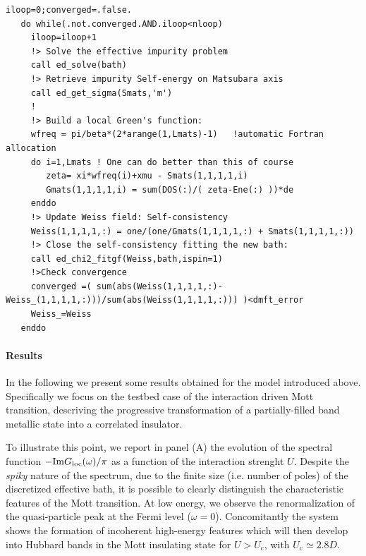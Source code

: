 \documentclass[edipack2.tex]{subfiles}
\begin{document}
\begin{lstlisting}[style=fstyle,numbers=none,basicstyle={\scriptsize\ttfamily}]
iloop=0;converged=.false.
   do while(.not.converged.AND.iloop<nloop)
     iloop=iloop+1     
     !> Solve the effective impurity problem
     call ed_solve(bath)     
     !> Retrieve impurity Self-energy on Matsubara axis
     call ed_get_sigma(Smats,'m')
     !
     !> Build a local Green's function:
     wfreq = pi/beta*(2*arange(1,Lmats)-1)   !automatic Fortran allocation
     do i=1,Lmats ! One can do better than this of course 
        zeta= xi*wfreq(i)+xmu - Smats(1,1,1,1,i)
        Gmats(1,1,1,1,i) = sum(DOS(:)/( zeta-Ene(:) ))*de  
     enddo
     !> Update Weiss field: Self-consistency
     Weiss(1,1,1,1,:) = one/(one/Gmats(1,1,1,1,:) + Smats(1,1,1,1,:))
     !> Close the self-consistency fitting the new bath:
     call ed_chi2_fitgf(Weiss,bath,ispin=1)     
     !>Check convergence
     converged =( sum(abs(Weiss(1,1,1,1,:)-Weiss_(1,1,1,1,:)))/sum(abs(Weiss(1,1,1,1,:))) )<dmft_error
     Weiss_=Weiss     
   enddo
\end{lstlisting}


\paragraph{Results}
In the following we present some results obtained for the model
introduced above. Specifically we focus on the testbed case of the interaction
driven Mott transition, descriving the progressive
transformation of a partially-filled band metallic state into a correlated insulator. 

To illustrate this point, we report in panel (A) the evolution of
the spectral function $-{\rm Im}G_\mathrm{loc}(\omega)/\pi$ as a function of
the interaction strenght $U$. Despite the {\it spiky} nature of the spectrum, due to the
finite size (i.e. number of poles) of the discretized effective bath,
it is possible to clearly distinguish the characteristic features of
the Mott transition. At low energy, we observe the renormalization of the 
quasi-particle peak at the Fermi level ($\omega=0$). Concomitantly the
system shows the formation of incoherent  high-energy features which
will then develop into Hubbard bands in the Mott insulating state for $U>U_\mathrm{c}$, with $U_\mathrm{c}\simeq 2.8D$. 
\end{document}
